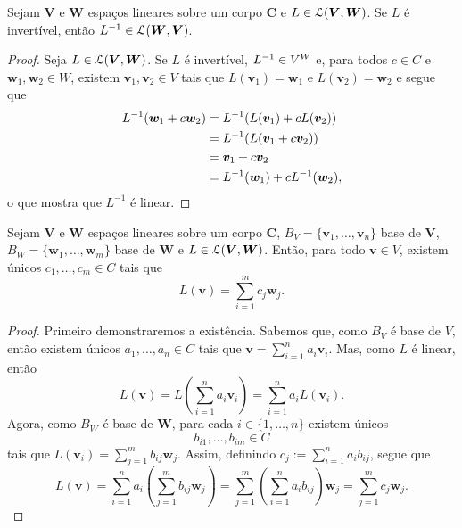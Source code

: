 \begin{prop}
Sejam $\bm V$ e $\bm W$ espaços lineares sobre um corpo $\bm C$ e $L \in \mathcal{L}(\bm V,\bm W)$. Se $L$ é invertível, então $L^{-1} \in \mathcal{L}(\bm W,\bm V)$.
\end{prop}
\begin{proof}
Seja $L \in \mathcal{L}(\bm V,\bm W)$. Se $L$ é invertível, $L^{-1} \in V^W$ e, para todos $c \in C$ e $\bm w_1,\bm w_2 \in W$, existem $\bm v_1,\bm v_2 \in V$ tais que $L(\bm v_1)=\bm w_1$ e $L(\bm v_2)=\bm w_2$ e segue que
	\begin{align*}
	L^{-1}(\bm w_1+c\bm w_2)&=L^{-1}(L(\bm v_1)+cL(\bm v_2)) \\
	&= L^{-1}(L(\bm v_1+c\bm v_2)) \\
	&= \bm v_1+c\bm v_2 \\
	&= L^{-1}(\bm w_1)+cL^{-1}(\bm w_2),
	\end{align*}
o que mostra que $L^{-1}$ é linear.
\end{proof}

\begin{prop}
Sejam $\bm V$ e $\bm W$ espaços lineares sobre um corpo $\bm C$, $B_V=\{\bm v_1,\ldots,\bm v_n\}$ base de $\bm V$, $B_W=\{\bm w_1,\ldots,\bm w_m\}$ base de $\bm W$ e $L \in \mathcal{L}(\bm V,\bm W)$. Então, para todo $\bm v \in V$, existem únicos $c_1,\ldots,c_m \in C$ tais que
	\begin{equation*}
	L(\bm v) = \sum_{i=1}^m c_j \bm w_j.
	\end{equation*}
\end{prop}
\begin{proof}
	Primeiro demonstraremos a existência. Sabemos que, como $B_V$ é base de $V$, então existem únicos $a_1,\ldots,a_n \in C$ tais que $\bm v = \sum_{i=1}^n a_i\bm v_i$. Mas, como $L$ é linear, então
	\begin{equation*}
	L(\bm v) = L\left( \sum_{i=1}^n a_i \bm v_i \right) = \sum_{i=1}^n a_i L(\bm v_i).
	\end{equation*}
	Agora, como $B_W$ é base de $\bm W$, para cada $i \in \{1,\ldots,n\}$ existem únicos
	\begin{equation*}
	b_{i1},\ldots,b_{im} \in C
	\end{equation*}
tais que  $L(\bm v_i)=\sum_{j=1}^m b_{ij} \bm w_j$. Assim, definindo $c_j := \sum_{i=1}^n a_i b_{ij}$, segue que
	\begin{equation*}
	L(\bm v)=\sum_{i=1}^n a_i \left(\sum_{j=1}^m b_{ij} \bm w_j \right) = \sum_{j=1}^m \left(\sum_{i=1}^n a_i b_{ij}\right) \bm w_j = \sum_{j=1}^m c_j \bm w_j.
	\end{equation*}

\end{proof}

